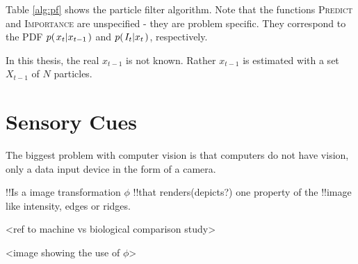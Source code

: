 Table \ref{alg:pf} shows the particle filter algorithm. Note that the functions \textsc{Predict} and \textsc{Importance} are unspecified
- they are problem specific. They correspond to the PDF $p{(\left. x_t \middle\vert x_{t-1} \right.)}$ and $p{(\left. I_t \middle\vert x_t \right.)}$, respectively.


In this thesis, the real $x_{t-1}$ is not known. Rather $x_{t-1}$ is estimated with a set $X_{t-1}$ of $N$ particles.

\section{Sensory Cues}

The biggest problem with computer vision is that computers do not have
vision, only a data input device in the form of a camera. 


!!Is a image transformation $\phi$ 
!!that renders(depicts?) one property of the
!!image like intensity, edges or ridges.

<ref to machine vs biological comparison study>


<image showing the use of $\phi$>



